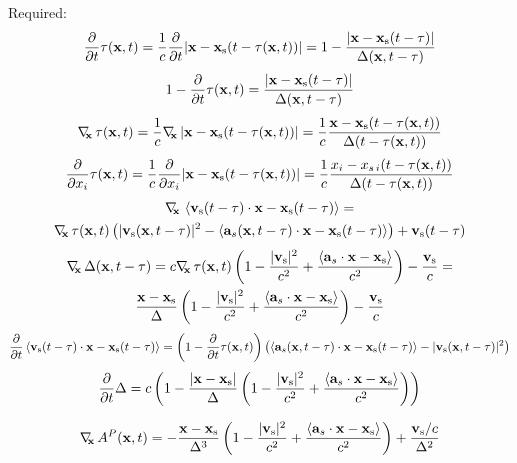 Required:
\begin{equation}
\frac{\partial}{\partial t} \tau(\mathbf{x},t) = \frac{1}{c}\frac{\partial}{\partial t} |\mathbf{x}-\mathbf{x}_{\mathrm{s}}(t-\tau(\mathbf{x},t))| = 1 - \frac{|\mathbf{x}-\mathbf{x}_{\mathrm{s}}(t-\tau)|}{\Delta(\mathbf{x},t-\tau)}
\end{equation}
\begin{equation}
1-\frac{\partial}{\partial t} \tau(\mathbf{x},t) = \frac{|\mathbf{x}-\mathbf{x}_{\mathrm{s}}(t-\tau)|}{\Delta(\mathbf{x},t-\tau)}
\end{equation}
\begin{equation}
\nabla_{\!\!\mathbf{x}}\, \tau(\mathbf{x},t) = \frac{1}{c} \nabla_{\!\!\mathbf{x}}\, |\mathbf{x}-\mathbf{x}_{\mathrm{s}}(t-\tau(\mathbf{x},t))| = \frac{1}{c} \frac{\mathbf{x} -\mathbf{x}_{\mathrm{s}}(t-\tau(\mathbf{x},t))}{\Delta(t-\tau(\mathbf{x},t))}
\end{equation}
\begin{equation}
\frac{\partial}{\partial x_i} \tau(\mathbf{x},t) = \frac{1}{c}\frac{\partial}{\partial x_i} |\mathbf{x}-\mathbf{x}_{\mathrm{s}}(t-\tau(\mathbf{x},t))| = \frac{1}{c} \frac{x_i -x_{s\, i}(t-\tau(\mathbf{x},t))}{\Delta(t-\tau(\mathbf{x},t))}
\end{equation}
\begin{multline}
\nabla_{\!\!\mathbf{x}}\, \left< \mathbf{v}_{\mathrm{s}}(t-\tau) \cdot \mathbf{x} - \mathbf{x}_{\mathrm{s}}(t-\tau) \right> = \\ \nabla_{\!\!\mathbf{x}}\, \tau(\mathbf{x},t) \left( |\mathbf{v}_{\mathrm{s}}(\mathbf{x},t-\tau)|^2 - \left< \mathbf{a}_s(\mathbf{x},t-\tau) \cdot \mathbf{x} - \mathbf{x}_{\mathrm{s}}(t-\tau) \right> \right) + \mathbf{v}_{\mathrm{s}}(t-\tau)
\end{multline}
\begin{multline}
\nabla_{\!\!\mathbf{x}}\, \Delta(\mathbf{x},t-\tau) =  c \nabla_{\!\!\mathbf{x}}\, \tau(\mathbf{x},t) \left( 1-  \frac{|\mathbf{v}_{\mathrm{s}}|^2}{c^2} + \frac{\left< \mathbf{a}_s \cdot \mathbf{x} - \mathbf{x}_{\mathrm{s}} \right>}{c^2} \right) - \frac{\mathbf{v}_{\mathrm{s}}}{c}
=
\\ \frac{\mathbf{x} -\mathbf{x}_{\mathrm{s}}}{\Delta} \left( 1-  \frac{|\mathbf{v}_{\mathrm{s}}|^2}{c^2} + \frac{\left< \mathbf{a}_s \cdot \mathbf{x} - \mathbf{x}_{\mathrm{s}} \right>}{c^2} \right) - \frac{\mathbf{v}_{\mathrm{s}} }{c}
\end{multline}
\begin{multline}
\frac{\partial}{\partial t	} \left< \mathbf{v}_{\mathrm{s}}(t-\tau) \cdot \mathbf{x} - \mathbf{x}_{\mathrm{s}}(t-\tau) \right> = \left( 1-\frac{\partial}{\partial t} \tau(\mathbf{x},t) \right) \left( \left< \mathbf{a}_s(\mathbf{x},t-\tau) \cdot \mathbf{x} - \mathbf{x}_{\mathrm{s}}(t-\tau) \right> - |\mathbf{v}_{\mathrm{s}}(\mathbf{x},t-\tau)|^2 \right)
\end{multline}
\begin{equation}
\frac{\partial}{\partial t} \Delta = 
c\left( 1-\frac{|\mathbf{x}-\mathbf{x}_{\mathrm{s}}|}{\Delta}
\left(  1-  \frac{|\mathbf{v}_{\mathrm{s}}|^2}{c^2} + \frac{\left< \mathbf{a}_s \cdot \mathbf{x} - \mathbf{x}_{\mathrm{s}} \right>}{c^2} \right)  \right)
\end{equation}


\begin{equation}
\nabla_{\!\!\mathbf{x}}\, A^{P}(\mathbf{x},t) = -\frac{\mathbf{x}-\mathbf{x}_{\mathrm{s}}}{\Delta^3} \left( 1- \frac{|\mathbf{v}_{\mathrm{s}}|^2}{c^2} + \frac{\left< \mathbf{a}_s \cdot \mathbf{x}-\mathbf{x}_{\mathrm{s}} \right>}{c^2}\right)
+\frac{\mathbf{v}_{\mathrm{s}}/c}{\Delta^2}
\end{equation}

